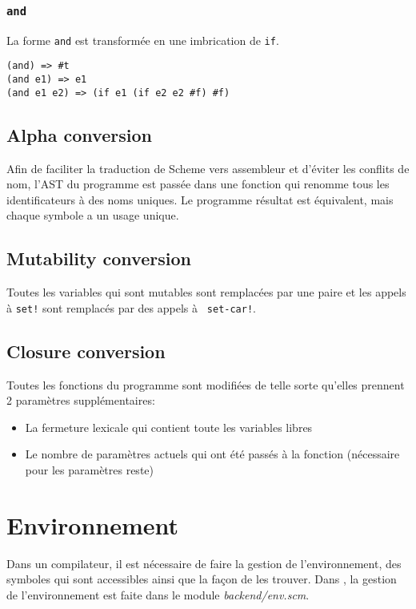 \documentclass[11pt]{report}
\begin{document}
\subsection{\tt and}

La forme {\tt and} est transformée en une imbrication de {\tt if}.


\begin{verbatim}
(and) => #t
(and e1) => e1
(and e1 e2) => (if e1 (if e2 e2 #f) #f)
\end{verbatim}


\section{Alpha conversion}

Afin de faciliter la traduction de Scheme vers assembleur et d'éviter
les conflits de nom, l'AST du programme est passée dans une fonction
qui renomme tous les identificateurs à des noms uniques.  Le programme
résultat est équivalent, mais chaque symbole a un usage unique.


\section{Mutability conversion}

Toutes les variables qui sont mutables sont remplacées par une paire
et les appels à {\tt set!} sont remplacés par des appels à {\tt
  set-car!}.

\section{Closure conversion}

Toutes les fonctions du programme sont modifiées de telle sorte
qu'elles prennent 2 paramètres supplémentaires:

\begin{itemize}
\item La fermeture lexicale qui contient toute les variables libres
\item Le nombre de paramètres actuels qui ont été passés à la fonction
  (nécessaire pour les paramètres reste)
\end{itemize}




\chapter{Environnement}

Dans un compilateur, il est nécessaire de faire la gestion de
l'environnement, des symboles qui sont accessibles ainsi que la façon
de les trouver.  Dans \sins{}, la gestion de l'environnement est
faite dans le module {\it backend/env.scm}.
\end{document}
